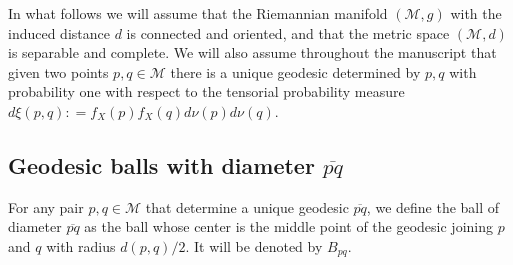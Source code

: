 \documentclass[a4paper]{article}
\def\defeq{\mathrel{\mathop:}=}
\numberwithin{equation}{section}
\def\defeq{\mathrel{\mathop:}=}
\newcommand{\M}{\mbox{$\mathcal{M}$}}
\begin{document}
In what follows we will assume that the Riemannian manifold $(\M,g)$ with the induced distance $d$ is connected and oriented, and that the metric space $(\M,d)$ is separable and complete. We will also assume throughout the manuscript that given two points $p,q \in \M$  there is a unique geodesic determined by $p,q$ with probability one with respect to the tensorial probability measure $d\xi(p,q) \defeq f_X(p)f_X(q)d \nu(p)d\nu(q)$.

\subsection{Geodesic balls with diameter $\overline{pq}$}
\label{bolasgeodesicas}
For any pair $p,q \in \M$ that determine a unique geodesic   $\overline{pq}$,  we define the ball of diameter  $\overline{pq}$  as the ball whose center is the middle point of the geodesic joining $p$ and $q$ with radius $d(p,q)/2$. It will be denoted by $B_{pq}$.
\end{document}
